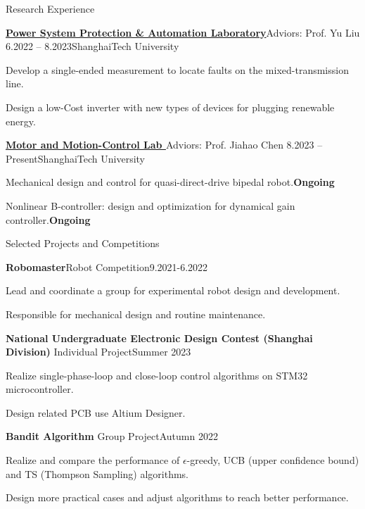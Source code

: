 \documentclass[]{ZhongtaoGuan-resume}
\begin{document}
\begin{section}{Research Experience}
 \begin{subsection}{\textbf{\href{https://pspal.shanghaitech.edu.cn/}{Power System Protection \& Automation Laboratory}}}{Adviors: Prof. Yu Liu}{ 6.2022 -- 8.2023}{ShanghaiTech University}
     \item{Develop a single-ended measurement to locate faults on the mixed-transmission line.}
     \item{Design a low-Cost inverter with new types of devices for plugging renewable energy.}
 \end{subsection}
 
 \begin{subsection}{ \textbf{\href{https://faculty.sist.shanghaitech.edu.cn/chenjh/}{Motor and Motion-Control Lab }}}{Adviors: Prof. Jiahao Chen}{ 8.2023 -- Present}{ShanghaiTech University}
     \item{Mechanical design and control for quasi-direct-drive bipedal robot.}\hfill{\textbf{Ongoing}}
     \item{Nonlinear B-controller: design and optimization for dynamical gain controller.}\hfill{\textbf{Ongoing}}
 \end{subsection}
\end{section}


\begin{section}{Selected Projects and Competitions} 
 \begin{subsection}{\textbf{Robomaster}}{Robot Competition}{9.2021-6.2022}{}
     \item{Lead and coordinate a group for experimental robot design and development.}
     \item{Responsible for mechanical design and routine maintenance.}

 \end{subsection}
 \begin{subsection}{\textbf{National Undergraduate Electronic Design Contest (Shanghai Division)}}
     {Individual Project}{Summer 2023}{}
     \item{Realize single-phase-loop and close-loop control algorithms on STM32 microcontroller.}
     \item{Design related PCB use Altium Designer.}
 \end{subsection}
 \begin{subsection}{\textbf{Bandit Algorithm}}
     {Group Project}{Autumn 2022}{}
     \item{Realize and compare the performance of $\epsilon$-greedy, UCB (upper confidence bound) and TS (Thompson Sampling) algorithms.}
     \item{Design more practical cases and adjust algorithms to reach better performance.}
 \end{subsection}
\end{section}
\end{document}
